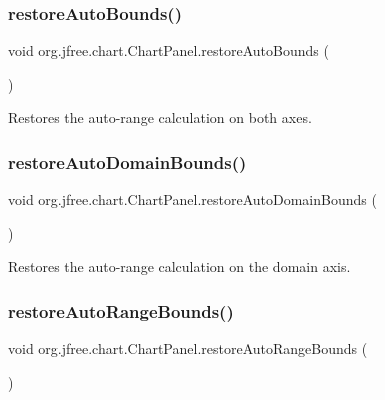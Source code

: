 \subsubsection{\texorpdfstring{restore\+Auto\+Bounds()}{restoreAutoBounds()}}
{\footnotesize\ttfamily void org.\+jfree.\+chart.\+Chart\+Panel.\+restore\+Auto\+Bounds (\begin{DoxyParamCaption}{ }\end{DoxyParamCaption})}

Restores the auto-\/range calculation on both axes. \mbox{\label{classorg_1_1jfree_1_1chart_1_1_chart_panel_aa684c26e400e2609832e49a74405dbeb}} 
\subsubsection{\texorpdfstring{restore\+Auto\+Domain\+Bounds()}{restoreAutoDomainBounds()}}
{\footnotesize\ttfamily void org.\+jfree.\+chart.\+Chart\+Panel.\+restore\+Auto\+Domain\+Bounds (\begin{DoxyParamCaption}{ }\end{DoxyParamCaption})}

Restores the auto-\/range calculation on the domain axis. \mbox{\label{classorg_1_1jfree_1_1chart_1_1_chart_panel_a8a9de5e50faa0712dffee7c70b927029}} 
\subsubsection{\texorpdfstring{restore\+Auto\+Range\+Bounds()}{restoreAutoRangeBounds()}}
{\footnotesize\ttfamily void org.\+jfree.\+chart.\+Chart\+Panel.\+restore\+Auto\+Range\+Bounds (\begin{DoxyParamCaption}{ }\end{DoxyParamCaption})}

